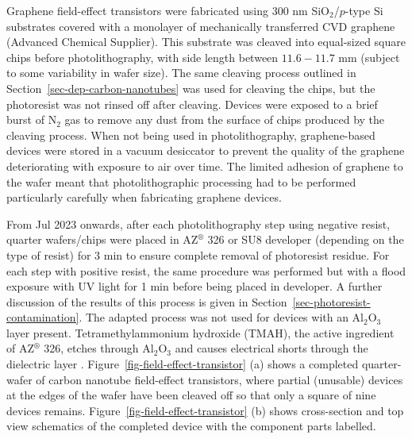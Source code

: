 \documentclass[
  a4paper,
]{scrbook}
\begin{document}
Graphene field-effect transistors were fabricated using 300 nm
SiO\(_2\)/\(p\)-type Si substrates covered with a monolayer of
mechanically transferred CVD graphene (Advanced Chemical Supplier). This
substrate was cleaved into equal-sized square chips before
photolithography, with side length between \(11.6-11.7\) mm (subject to
some variability in wafer size). The same cleaving process outlined in
Section~\ref{sec-dep-carbon-nanotubes} was used for cleaving the chips,
but the photoresist was not rinsed off after cleaving. Devices were
exposed to a brief burst of N\(_2\) gas to remove any dust from the
surface of chips produced by the cleaving process. When not being used
in photolithography, graphene-based devices were stored in a vacuum
desiccator to prevent the quality of the graphene deteriorating with
exposure to air over time. The limited adhesion of graphene to the wafer
meant that photolithographic processing had to be performed particularly
carefully when fabricating graphene devices.

From Jul 2023 onwards, after each photolithography step using negative
resist, quarter wafers/chips were placed in AZ\(^\circledR\) 326 or SU8
developer (depending on the type of resist) for 3 min to ensure complete
removal of photoresist residue. For each step with positive resist, the
same procedure was performed but with a flood exposure with UV light for
1 min before being placed in developer. A further discussion of the
results of this process is given in
Section~\ref{sec-photoresist-contamination}. The adapted process was not
used for devices with an Al\(_2\)O\(_3\) layer present.
Tetramethylammonium hydroxide (TMAH), the active ingredient of
AZ\(^\circledR\) 326, etches through Al\(_2\)O\(_3\) and causes
electrical shorts through the dielectric layer
\autocite{Oh2011,Ali2021}. Figure~\ref{fig-field-effect-transistor} (a)
shows a completed quarter-wafer of carbon nanotube field-effect
transistors, where partial (unusable) devices at the edges of the wafer
have been cleaved off so that only a square of nine devices remains.
Figure~\ref{fig-field-effect-transistor} (b) shows cross-section and top
view schematics of the completed device with the component parts
labelled.
\end{document}
